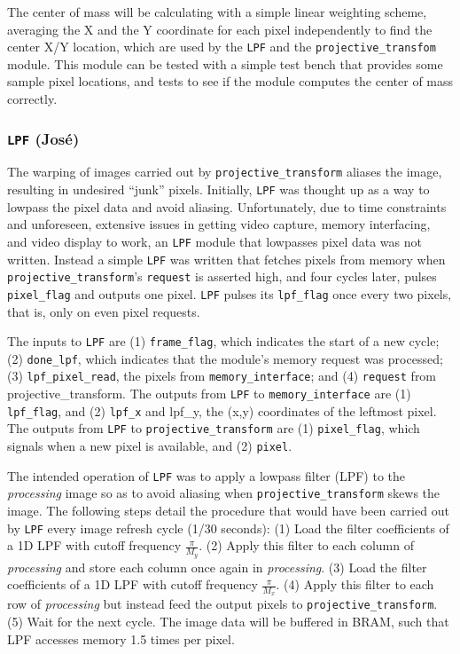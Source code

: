 \documentclass[10pt]{article}
\begin{document}
The center of mass will be calculating with a simple linear weighting scheme, averaging the X and the Y coordinate for each pixel independently to find the center X/Y location, which are used by the {\tt LPF} and the {\tt projective\_transfom} module. This module can be tested with a simple test bench that provides some sample pixel locations, and tests to see if the module computes the center of mass correctly.

\subsubsection{{\tt LPF} (Jos\'{e})}
The warping of images carried out by {\tt projective\_transform} aliases the image, resulting in undesired ``junk'' pixels. Initially, {\tt LPF} was thought up as a way to lowpass the pixel data and avoid aliasing. Unfortunately, due to time constraints and unforeseen, extensive issues in getting video capture, memory interfacing, and video display to work, an {\tt LPF} module that lowpasses pixel data was not written. Instead a simple {\tt LPF} was written that fetches pixels from memory when {\tt projective\_transform}'s {\tt request} is asserted high, and four cycles later, pulses {\tt pixel\_flag} and outputs one pixel. {\tt LPF} pulses its {\tt lpf\_flag} once every two pixels, that is, only on even pixel requests.

The inputs to {\tt LPF} are (1) {\tt frame\_flag}, which indicates the start of a new cycle; (2) {\tt done\_lpf}, which indicates that the module's memory request was processed; (3) {\tt lpf\_pixel\_read}, the pixels from {\tt memory\_interface}; and (4) {\tt request} from {projective\_transform}. The outputs from {\tt LPF} to {\tt memory\_interface} are (1) {\tt lpf\_flag}, and (2) {\tt lpf\_x} and {lpf\_y}, the (x,y) coordinates of the leftmost pixel. The outputs from {\tt LPF} to {\tt projective\_transform} are (1) {\tt pixel\_flag}, which signals when a new pixel is available, and (2) {\tt pixel}.

The intended operation of {\tt LPF} was to apply a lowpass filter (LPF) to the {\it processing} image so as to avoid aliasing when {\tt projective\_transform} skews the image. The following steps detail the procedure that would have been carried out by {\tt LPF} every image refresh cycle (1/30 seconds): (1) Load the filter coefficients of a 1D LPF with cutoff frequency \( \frac{\pi}{M_y} \). (2) Apply this filter to each column of {\it processing} and store each column once again in {\it processing}. (3) Load the filter coefficients of a 1D LPF with cutoff frequency \( \frac{\pi}{M_x} \). (4) Apply this filter to each row of {\it processing} but instead feed the output pixels to {\tt projective\_transform}. (5) Wait for the next cycle. The image data will be buffered in BRAM, such that LPF accesses memory 1.5 times per pixel.
\end{document}
